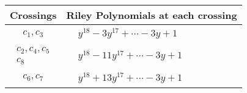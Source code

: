 \documentclass[1p]{elsarticle_modified}
\theoremstyle{definition}
\begin{document}
\begin{tabular}{m{50pt}|m{274pt}}
Crossings & \hspace{64pt}Riley Polynomials at each crossing \\
\hline $$\begin{aligned}c_{1},c_{3}\end{aligned}$$&$\begin{aligned}
&y^{18}-3 y^{17}+\cdots-3 y+1
\end{aligned}$\\
\hline $$\begin{aligned}c_{2},c_{4},c_{5}\\c_{8}\end{aligned}$$&$\begin{aligned}
&y^{18}-11 y^{17}+\cdots-3 y+1
\end{aligned}$\\
\hline $$\begin{aligned}c_{6},c_{7}\end{aligned}$$&$\begin{aligned}
&y^{18}+13 y^{17}+\cdots-3 y+1
\end{aligned}$\\
\hline
\end{tabular}
\vskip 2pc
\end{document}
